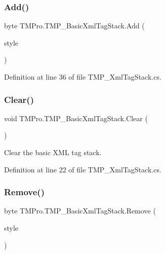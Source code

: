 \subsubsection{\texorpdfstring{Add()}{Add()}}
{\footnotesize\ttfamily byte T\+M\+Pro.\+T\+M\+P\+\_\+\+Basic\+Xml\+Tag\+Stack.\+Add (\begin{DoxyParamCaption}\item[{\mbox{\hyperlink{namespace_t_m_pro_aedf79b6e7e2ce2b9c9ac84e790596e7c}{Font\+Styles}}}]{style }\end{DoxyParamCaption})}



Definition at line 36 of file T\+M\+P\+\_\+\+Xml\+Tag\+Stack.\+cs.

\mbox{\label{struct_t_m_pro_1_1_t_m_p___basic_xml_tag_stack_a67f44a1d30eec477ca2b1ef66c5a3635}} 
\subsubsection{\texorpdfstring{Clear()}{Clear()}}
{\footnotesize\ttfamily void T\+M\+Pro.\+T\+M\+P\+\_\+\+Basic\+Xml\+Tag\+Stack.\+Clear (\begin{DoxyParamCaption}{ }\end{DoxyParamCaption})}



Clear the basic X\+ML tag stack. 



Definition at line 22 of file T\+M\+P\+\_\+\+Xml\+Tag\+Stack.\+cs.

\mbox{\label{struct_t_m_pro_1_1_t_m_p___basic_xml_tag_stack_a437fa11f63cde0b26db36285d85e1b5c}} 
\subsubsection{\texorpdfstring{Remove()}{Remove()}}
{\footnotesize\ttfamily byte T\+M\+Pro.\+T\+M\+P\+\_\+\+Basic\+Xml\+Tag\+Stack.\+Remove (\begin{DoxyParamCaption}\item[{\mbox{\hyperlink{namespace_t_m_pro_aedf79b6e7e2ce2b9c9ac84e790596e7c}{Font\+Styles}}}]{style }\end{DoxyParamCaption})}



